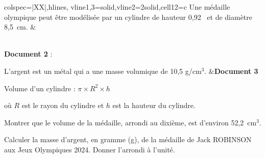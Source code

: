 \documentclass[12pt,a4paper,french]{article}
\begin{document}
\begin{énumérer}
\begin{tblr}{colspec={|XX|},hlines, vline{1,3}={solid},vline{2}={2}{solid},cell{1}{2}={c}}
Une médaille olympique peut être modélisée par un cylindre de hauteur 0{,}92\  et de diamètre 8{,}5\ cm. &
\\
\textbf{Document 2} :

L'argent est un métal qui a une masse volumique de 10,5 g/cm$^3$. &\textbf{Document 3}

Volume d'un cylindre : $ \pi \times R^2 \times h$

où $R$ est le rayon du cylindre et $h$ est la hauteur du cylindre.\\
\end{tblr}

\medskip

	\begin{énumérer}
		\item Montrer que le volume de la médaille, arrondi au dixième, est d'environ 52,2~cm$^3$.
		\item Calculer la masse d'argent, en gramme (g), de la médaille de Jack ROBINSON aux Jeux Olympiques 2024. Donner l'arrondi à l'unité.
	\end{énumérer}
\end{énumérer}
\end{document}
